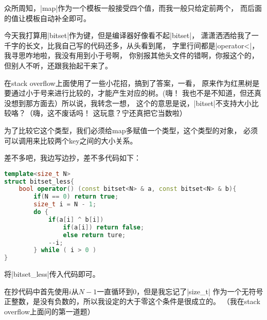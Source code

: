 众所周知，\vb|map|作为一个模板一般接受四个值，而我一般只给定前两个，
而后面的值让模板自动补全即可。

今天我打算用\vb|bitset|作为键，但是编译器好像看不起\vb|bitset|，
潇潇洒洒给我了一千字的长文，比我自己写的代码还多，从头看到尾，
字里行间都是\vb|operator<|，我寻思咋地啦，我没有用到小于号啊，
你别报其他头文件的错啊，你报这个的，但别人不听，还跟我抬起干来了。

在stack overflow上面使用了一些小花招，搞到了答案，一看，
原来作为红黑树是要通过小于号来进行比较的，才能产生对应的树。(嗨！
我也不是不知道，但还真没想到那方面去）所以说，我转念一想，
这个的意思是说，\vb|bitset|不支持大小比较咯？（嗨，这不废话吗！
这玩意？宁还真把它当数啦）

为了比较它这个类型，我们必须给map多赋值一个类型，这个类型的对象，
必须可以调用来比较两个key之间的大小关系。

差不多吧，我边写边抄，差不多代码如下：
\begin{lstlisting}[language=C++]
template<size_t N>
struct bitset_less{
    bool operator() (const bitset<N> & a, const bitset<N> & b){
        if(N == 0) return true;
        size_t i = N - 1;
        do {
            if(a[i] ^ b[i])
                if(a[i]) return false;
                else return ture;
            --i;
        } while ( i > 0 )
}
\end{lstlisting}

将\vb|bitset\_less|传入代码即可。

在抄代码中首先使用$i$从$N-1$一直循环到$0$，但是我忘记了\vb|size\_t|
作为一个无符号正整数，是没有负数的，所以我设定的大于零这个条件是很成立的。
（我在stack overflow上面问的第一道题）


